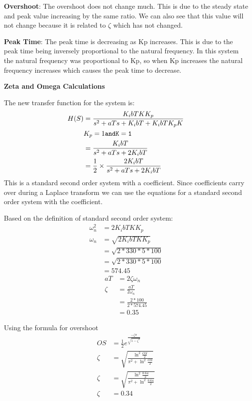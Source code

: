 \documentclass{article}
\begin{document}
\textbf{Overshoot}: The overshoot does not change much. This is due to the steady state and peak value increasing by the same ratio. We can also see that this value will not change because it is related to $\zeta$ which has not changed.

\textbf{Peak Time}: The peak time is decreasing as Kp increases. This is due to the peak time being inversely proportional to the natural frequency. In this system the natural frequency was proportional to Kp, so when Kp increases the natural frequency increases which causes the peak time to decrease.

\textbf{Zeta and Omega Calculations}

The new transfer function for the system is:
\begin{align*}
    H(S) &= \frac{K_ibTKK_p}{s^2 + aTs + K_ibT + K_ibTK_pK}\\
            & K_p = 1 \tt{ and } K = 1\\
            &= \frac{K_ibT}{s^2 + aTs + 2K_ibT}\\
            &= \frac{1}{2} \times \frac{2K_ibT}{s^2 + aTs + 2K_ibT}\\
\end{align*}
This is a standard second order system with a coefficient. Since coefficients carry over during a Laplace transform we can use the equations for a standard second order system with the coefficient.

Based on the definition of standard second order system:
\begin{align*}
    \omega_n^2 &= 2K_ibTKK_p\\
    \omega_n &= \sqrt{2K_ibTKK_p}\\
        &= \sqrt{2 * 330 * 5 * 100}\\
        &= \sqrt{2 * 330 * 5 * 100}\\
        &= 574.45
\end{align*}
\begin{align*}
    aT &= 2\zeta\omega_n\\
    \zeta &= \frac{aT}{2\omega_n}\\
        &= \frac{2 * 100}{2 * 574.45}\\
        &= 0.35
\end{align*}


Using the formula for overshoot
\begin{align*}
    OS &= \frac{1}{2} e^{\frac{-\zeta\pi}{\sqrt{1-\zeta^2}}}\\
    \zeta &= \sqrt{\frac{\ln^2 {\frac{OS}{2}}}{\pi^2 +\ln^2 {\frac{OS}{2}}}} \\
    \zeta &= \sqrt{\frac{\ln^2 {\frac{0.64}{2}}}{\pi^2 +\ln^2 {\frac{0.64}{2}}}} \\
    \zeta &=  0.34\\
\end{align*}
\end{document}
